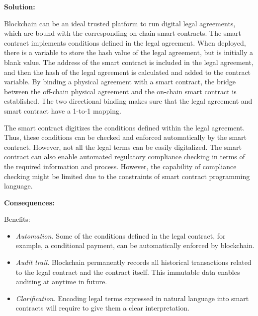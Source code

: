 \vspace{0.5em}\noindent \textbf{Solution:} 

Blockchain can be an ideal trusted platform to run digital legal agreements, which are bound with the corresponding on-chain smart contracts. The smart contract implements conditions defined in the legal agreement. When deployed, there is a variable to store the hash value of the legal agreement, but is initially a blank value. The address of the smart contract is included in the legal agreement, and then the hash of the legal agreement is calculated and added to the contract variable. %
By binding a physical agreement with a smart contract, the bridge between the off-chain physical agreement and the on-chain smart contract is established. The two directional binding makes sure that the legal agreement and smart contract have a 1-to-1 mapping.

The smart contract digitizes the conditions defined within the legal agreement. Thus, these conditions can be checked and enforced automatically by the smart contract. However, not all the legal terms can be easily digitalized. The smart contract can also enable automated regulatory compliance checking in terms of the required information and process. However, the capability of compliance checking might be limited due to the constraints of smart contract programming language. 


\vspace{0.5em}\noindent \textbf{Consequences:} 

Benefits:
\begin{itemize}
  \item \textit{Automation.} Some of the conditions defined in the legal contract, for example, a conditional payment, can be automatically enforced by blockchain. 
  \item \textit{Audit trail.} Blockchain permanently records all historical transactions related to the legal contract and the contract itself. This immutable data enables auditing at anytime in future.
  \item \textit{Clarification.} Encoding legal terms expressed in natural language into smart contracts will require to give them a clear interpretation.
\end{itemize}

